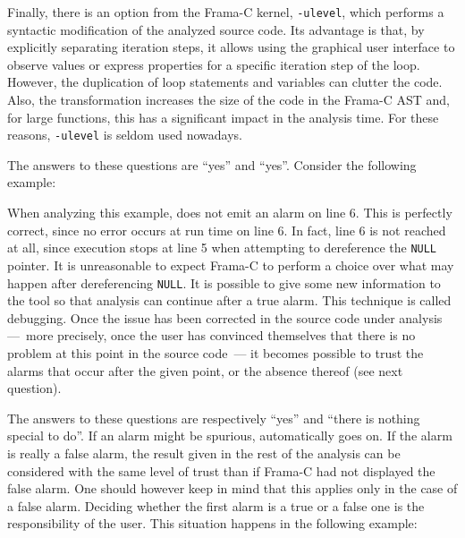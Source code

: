 \documentclass{frama-c-book}
\begin{document}
Finally, there is an option from the Frama-C kernel, \lstinline|-ulevel|,
which performs a syntactic modification of the analyzed source code.
Its advantage is that, by explicitly separating iteration steps,
it allows using the graphical user interface to observe values or express
properties for a specific iteration step of the loop.
However, the duplication of loop statements and variables can clutter the code.
Also, the transformation increases the size of the code in the Frama-C AST and,
for large functions, this has a significant impact in the analysis time.
For these reasons, \lstinline|-ulevel| is seldom used nowadays.



The answers to these questions are ``yes'' and ``yes''.
Consider the following example:


When analyzing this example, \Eva{} does not emit an
alarm on line 6. This is perfectly correct, since no error occurs at
run time on line 6. In fact, line 6 is not reached at all, since
execution stops at line 5 when attempting to dereference
the \lstinline|NULL| pointer. It is unreasonable to expect Frama-C to
perform a choice over what may happen after dereferencing
\lstinline|NULL|. It is possible to give some new information to the tool
so that analysis can continue after a true alarm. This technique is called
debugging. Once the issue has been corrected in the source code under
analysis ---~more precisely, once the user has convinced themselves
that there is no problem at this point in the source code~--- it
becomes possible to trust the alarms that occur after the given point,
or the absence thereof (see next question).


The answers to these questions are respectively ``yes'' and
``there is nothing special to do''. If an alarm might be spurious, \Eva{}
automatically goes on. If the alarm is really a
false alarm, the result given in the rest of the analysis can be
considered with the same level of trust than if Frama-C had not
displayed the false alarm. One should however keep in mind
that this applies only in
the case of a false alarm. Deciding whether the first alarm is a true
or a false one is the responsibility of the user.
This situation
happens in the following example:
\end{document}
